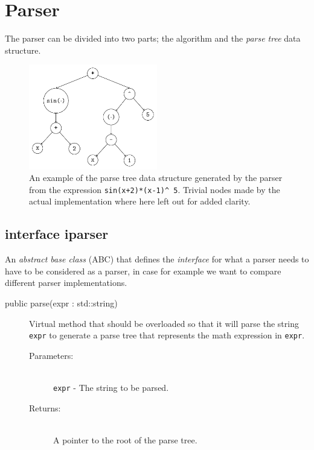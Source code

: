 \documentclass[a4paper,11pt]{kth-mag}
\begin{document}
\section{Parser}
The parser can be divided into two parts; the algorithm and the \emph{parse
tree} data structure. 

\begin{figure}[H]
\begin{center}
    \includegraphics[width=0.5\textwidth]{parse-tree.pdf}
    \caption{\small{
        An example of the parse tree data structure generated by the parser
        from the expression \texttt{sin(x+2)*(x-1)}\texttt{\^~}\!\!\texttt{5}.
        Trivial nodes made by the actual implementation where
        here left out for added clarity.
    }}
   \label{fig:parsetree}
\end{center}
\end{figure}

\subsection{interface iparser}
An \emph{abstract base class} (ABC) that defines the \emph{interface} for what a parser 
needs to have to be considered as a parser, in case for example
we want to compare different parser implementations.
\begin{description}
    \item[public parse(expr : std::string)] Virtual method that should be
    overloaded so that it will parse the string \texttt{expr} to
    generate a parse tree that represents the math expression in \texttt{expr}.
    \begin{description}
        \item[Parameters:]~\\
            \verb+expr+ - The string to be parsed.
        \item[Returns:]~\\
            A pointer to the root of the parse tree.
    \end{description}
\end{description}
\end{document}

